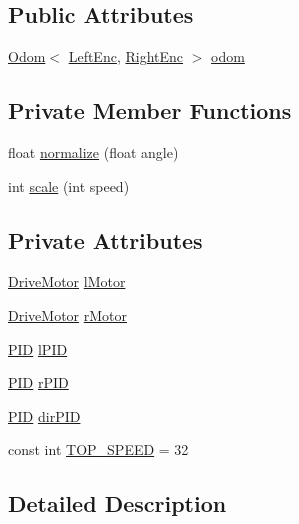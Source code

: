 \subsection*{Public Attributes}
\begin{DoxyCompactItemize}
\item 
\hyperlink{classOdom}{Odom}$<$ \hyperlink{classPIDBase_a7f9720adebb7763418d066d4fc4f8e25}{Left\-Enc}, \hyperlink{classPIDBase_ac5805fb7b51c9e4fedaab034d268464a}{Right\-Enc} $>$ \hyperlink{classPIDBase_a3adee9b84ba975616f672a7620ac16b8}{odom}
\end{DoxyCompactItemize}
\subsection*{Private Member Functions}
\begin{DoxyCompactItemize}
\item 
float \hyperlink{classPIDBase_a57c25abb7d7981fc0498fee62312d50e}{normalize} (float angle)
\item 
int \hyperlink{classPIDBase_acf14092bf5bcbc54e8bb717b37524534}{scale} (int speed)
\end{DoxyCompactItemize}
\subsection*{Private Attributes}
\begin{DoxyCompactItemize}
\item 
\hyperlink{classDriveMotor}{Drive\-Motor} \hyperlink{classPIDBase_a344ca2736e618d42445d568d038be7d9}{l\-Motor}
\item 
\hyperlink{classDriveMotor}{Drive\-Motor} \hyperlink{classPIDBase_ae52cf8a147c90af4334e1ad14f48aa4a}{r\-Motor}
\item 
\hyperlink{classPID}{P\-I\-D} \hyperlink{classPIDBase_a7e39df880dd6279479e77febe800a6ba}{l\-P\-I\-D}
\item 
\hyperlink{classPID}{P\-I\-D} \hyperlink{classPIDBase_a940d3dae6038a472ea613c03c5be3846}{r\-P\-I\-D}
\item 
\hyperlink{classPID}{P\-I\-D} \hyperlink{classPIDBase_a00db94bebcd5b966d8ee1020f8c33951}{dir\-P\-I\-D}
\item 
const int \hyperlink{classPIDBase_a42e66aae0ea7d5a54bffc062cc3ebf2b}{T\-O\-P\-\_\-\-S\-P\-E\-E\-D} = 32
\end{DoxyCompactItemize}


\subsection{Detailed Description}



